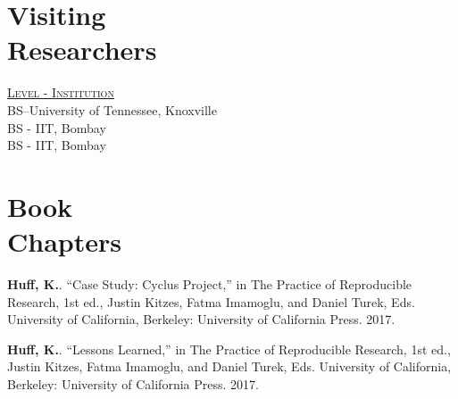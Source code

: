 \documentclass[margin,line]{resume}
\begin{document}
\begin{resume}
    \section{\mysidestyle Visiting\\Researchers}
    \hfill\textsc{\underline{Level - Institution}}\\
    \hfill BS--University of Tennessee, Knoxville\\ 
    \hfill BS - IIT, Bombay \\
    \hfill BS - IIT, Bombay\\
               \vspace{-2mm}
    \section{\mysidestyle Book\\Chapters}
      \begin{bibenum} 
      \item \textbf{Huff, K.}. ``Case Study: Cyclus Project,'' in The Practice 
              of Reproducible Research, 1st ed., Justin Kitzes, Fatma Imamoglu, 
              and Daniel Turek, Eds. University of California, Berkeley: 
              University of California Press. 2017.
      \item \textbf{Huff, K.}. ``Lessons Learned,'' in The Practice of Reproducible 
              Research, 1st ed., Justin Kitzes, Fatma Imamoglu, and Daniel 
              Turek, Eds. University of California, Berkeley: University of 
              California Press. 2017.
      \end{bibenum}


\end{resume}
\end{document}
